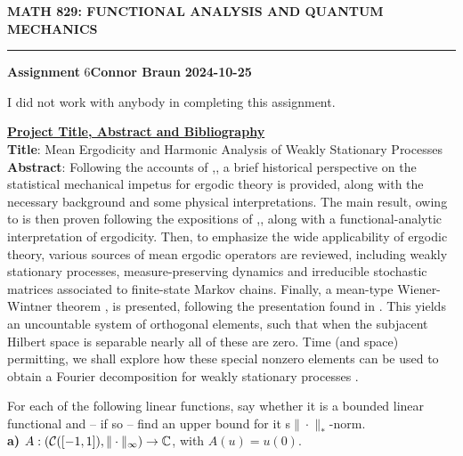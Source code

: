 \documentclass[10pt]{article}
\newcommand{\1}[1]{\mathbbm{1}_{#1}} \newcommand{\mc}[1]{\mathcal{#1}}
\begin{document}
    \begin{center}
        {\bf\large{MATH 829: FUNCTIONAL ANALYSIS AND QUANTUM MECHANICS}}
        \smallskip
        \hrule
        \smallskip
        {\bf Assignment} 6\hfill {\bf Connor Braun} \hfill {\bf 2024-10-25}
    \end{center}
    \vspace{5pt}
    \begin{center}
        \begin{minipage}{\dimexpr\paperwidth-10cm}
            I did not work with anybody in completing this assignment.
        \end{minipage}
    \end{center}
    \underline{\textbf{Project Title, Abstract and Bibliography}}\\[5pt]
    \textbf{Title}: Mean Ergodicity and Harmonic Analysis of Weakly Stationary Processes\\[5pt]
    \textbf{Abstract}: Following the accounts of \cite[ch. 1,8]{Eisner_etal_2015},\cite[ch. II.5]{Reed_Simon_1980}, a brief historical perspective on the statistical mechanical impetus
    for ergodic theory is provided, along with the necessary background and some
    physical interpretations. The main result, owing to \cite{Neumann_1932} is
    then proven following the expositions of \cite{Eisner_etal_2015},\cite{Reed_Simon_1980}, \cite{Weber_2009} along with a
    functional-analytic interpretation of ergodicity. Then, to emphasize the
    wide applicability of ergodic theory, various sources of mean ergodic operators
    are reviewed, including weakly stationary processes, measure-preserving
    dynamics and irreducible stochastic matrices associated to finite-state Markov chains.
    Finally, a mean-type Wiener-Wintner theorem \cite{Wiener_Wintner_1941}, \cite{Assani_2003} is
    presented, following the presentation found in \cite{Weber_2009}. This yields an
    uncountable system of orthogonal elements, such that when the subjacent
    Hilbert space is separable nearly all of these are zero. Time (and space) permitting, we
    shall explore how these special nonzero elements can be used to obtain a Fourier
    decomposition for weakly stationary processes \cite[$\S$6]{Fan_1946}.
    
    
    \newpage
     For each of the following linear functions, say whether it is a bounded linear functional and -- if so -- find an upper bound for it s$\|\cdot\|_\ast$-norm.\\[5pt]
    {\bf a)} $A:(\mc{C}([-1,1]), \|\cdot\|_\infty)\rightarrow\mbb{C}$, with $A(u)=u(0)$.\\[5pt]
\end{document}
